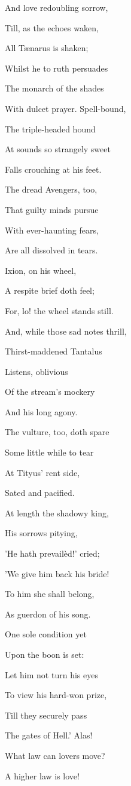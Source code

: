And love redoubling sorrow,

Till, as the echoes waken,

All Tænarus is shaken;

Whilst he to ruth persuades

The monarch of the shades

With dulcet prayer. Spell-bound,

The triple-headed hound

At sounds so strangely sweet

Falls crouching at his feet.

The dread Avengers, too,

That guilty minds pursue

With ever-haunting fears,

Are all dissolved in tears.

Ixion, on his wheel,

A respite brief doth feel;

For, lo! the wheel stands still.

And, while those sad notes thrill,

Thirst-maddened Tantalus

Listens, oblivious

Of the stream's mockery

And his long agony.

The vulture, too, doth spare

Some little while to tear

At Tityus' rent side,

Sated and pacified.

At length the shadowy king,

His sorrows pitying,

'He hath prevailèd!' cried;

'We give him back his bride!

To him she shall belong,

As guerdon of his song.

One sole condition yet

Upon the boon is set:

Let him not turn his eyes

To view his hard-won prize,

Till they securely pass

The gates of Hell.' Alas!

What law can lovers move?

A higher law is love!

